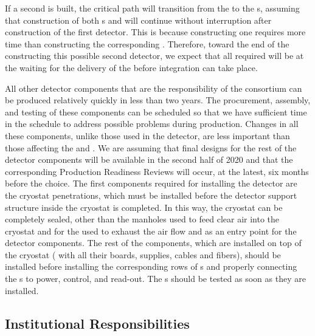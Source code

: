 If a second    is built, the critical
path will transition from the 
to the s, assuming that construction
of both s and  will continue 
without interruption after construction of the first detector. 
This is because constructing one  requires 
more time than constructing the corresponding . Therefore,
toward the end of the constructing this possible second detector,
we expect that all required  will be at the
 waiting for the delivery of the  before
integration can take place.

All other detector components that are the responsibility of the
 consortium can be produced relatively quickly
in less than two years. The procurement, assembly, and
testing of these components can be scheduled so that
we have sufficient time in the schedule to address possible 
problems during production. Changes in all these
components, unlike those used in the  detector,
are less important than those affecting the 
and . We are assuming that final
designs for the rest of the detector components will be 
available in the second half of 2020 and that the corresponding 
Production Readiness Reviews will occur, at the latest, six months 
before the  choice.
The first components 
required for installing the detector are the cryostat 
penetrations, which must be installed before the 
detector support structure inside the cryostat is completed.
In this way, the cryostat can be completely sealed, other than
the manholes used to feed clear air into the cryostat
and for the  used to exhaust the air flow
and as an entry point for the detector components. The rest of the
 components, which are installed on top of the 
cryostat ( with all their boards, supplies, cables
and fibers), should be installed before installing
the corresponding rows of s and properly connecting 
the s to power, control, and read-out. 
The s should be tested as soon as they are installed. 

\subsection{Institutional Responsibilities}
\label{sec:fdsp-tpcelec-management-resp}

